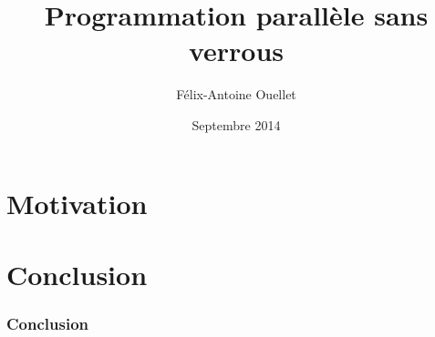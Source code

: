 \documentclass{beamer}
\author[Félix-Antoine Ouellet]{Félix-Antoine Ouellet}
\title[Lock-free\hspace{2em}\insertframenumber/\inserttotalframenumber]{Programmation parallèle sans verrous}
\institute{Université de Sherbrooke}
\date{Septembre 2014}
\begin{document}
\begin{frame}
\titlepage %
\end{frame}

\section{Motivation}


\section{Conclusion}
\begin{frame}
\frametitle{Conclusion}
\end{frame}
\end{document}
